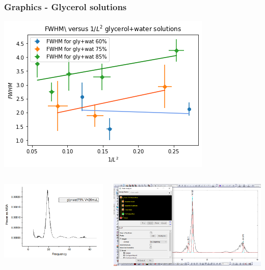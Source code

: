 \documentclass[xcolor=table]{beamer}
\begin{document}
\begin{frame}

\frametitle{Graphics - Glycerol solutions}

\fontsize{10}{10.2} \selectfont
\centering
\includegraphics[width=0.5\columnwidth]{glyvisc.PNG}\\
\begin{columns}
	\begin{column}{.5\textwidth}
\includegraphics[width=0.9\columnwidth]{multipeaks.PNG}
\end{column}
	\begin{column}{.6\textwidth}
\includegraphics[width=0.8\columnwidth]{FWHM.PNG}
\end{column}
\end{columns}
\end{frame}
\end{document}
